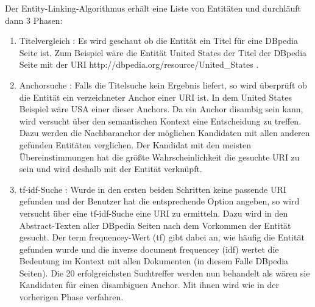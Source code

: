 \documentclass[11pt, a4paper, oneside]{Thesis} %
\begin{document}
Der Entity-Linking-Algorithmus erh\"alt eine Liste von Entit\"aten und durchl\"auft dann 3 Phasen:
\begin{enumerate}
\item Titelvergleich : Es wird geschaut ob die Entit\"at ein Titel f\"ur eine DBpedia Seite ist. Zum Beispiel w\"are die Entit\"at \glqq United States\grqq{} der Titel der DBpedia Seite mit der URI \glqq http://dbpedia.org/resource/United\_States\grqq{} .

\item Anchorsuche : Falls die Titelsuche kein Ergebnis liefert, so wird \"uberpr\"uft ob die Entit\"at ein verzeichneter Anchor einer URI ist. In dem United States Beispiel w\"are \glqq USA\grqq{} einer dieser Anchors. Da ein Anchor disambig sein kann, wird versucht \"uber den semantischen Kontext eine Entscheidung zu treffen. Dazu werden die Nachbaranchor der möglichen Kandidaten mit allen anderen gefunden Entit\"aten verglichen. Der Kandidat mit den meisten \"Ubereinstimmungen hat die grö\ss te Wahrscheinlichkeit die gesuchte URI zu sein und wird deshalb mit der Entit\"at verkn\"upft.

\item tf-idf-Suche : Wurde in den ersten beiden Schritten keine passende URI gefunden und der Benutzer hat die entsprechende Option angeben, so wird versucht \"uber eine tf-idf-Suche eine URI zu ermitteln. Dazu wird in den Abstract-Texten aller DBpedia Seiten nach dem Vorkommen der Entit\"at gesucht. Der \grqq term frequencey\grqq{}-Wert (tf) gibt dabei an, wie h\"aufig die Entit\"at gefunden wurde und die \grqq inverse document frequencey\grqq{} (idf) wertet die Bedeutung im Kontext mit allen Dokumenten (in diesem Falle DBpedia Seiten). Die 20 erfolgreichsten Suchtreffer werden nun behandelt als w\"aren sie Kandidaten f\"ur einen disambiguen Anchor. Mit ihnen wird wie in der vorherigen Phase verfahren.
\end{enumerate}
\end{document}
